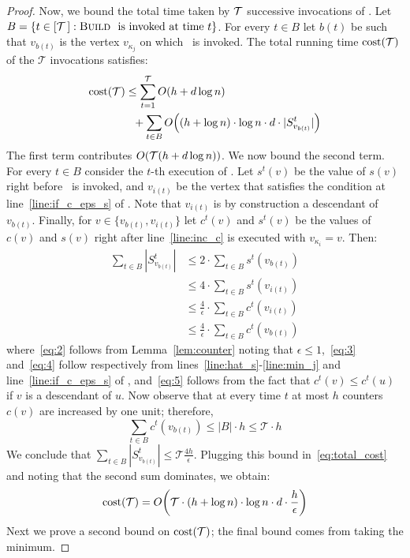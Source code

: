\begin{proof}
Now, we bound the total time taken by $\mathcal{T}$ successive invocations of \AlgoUpdate. Let $B = \{ t \in [\mathcal{T}\,]: \textsc{Build}\ \text{ is invoked at time } t\}$. For every $t \in B$ let $b(t)$ be such that $v_{b(t)}$ is the vertex $v_{\kappa_j}$ on which \AlgoBuild\ is invoked. The total running time $\operatorname*{\operatorname{cost}}(\mathcal T)$ of the $\mathcal T$ invocations satisfies:
\begin{align}
    \operatorname*{\operatorname{cost}}(\mathcal T) &\le \sum_{t=1}^{\mathcal T} O(h + d \log n)\nonumber \\&~~+ \sum_{t\in B} O\!\left((h+\log n) \cdot \log n \cdot d\cdot |S^t_{v_{b(t)}}|\right) \label{eq:total_cost} 
\end{align}
The first term contributes $O(\mathcal{T} (h+d \log n))$. We now bound the second term. For every $t \in B$ consider the $t$-th execution of \AlgoUpdate.
Let $s^t(v)$ be the value of $s(v)$ right before \AlgoBuild\ is invoked, and $v_{i(t)}$ be the vertex that satisfies the condition at line~\ref{line:if_c_eps_s} of \AlgoUpdate. Note that $v_{i(t)}$ is by construction a descendant of $v_{b(t)}$. Finally, for $v \in \{v_{b(t)},v_{i(t)}\}$ let $c^t({v})$ and $s^t(v)$ be the values of $c(v)$ and $s(v)$ right after line~\ref{line:inc_c} is executed with $v_{\kappa_i}=v$. Then:
\begin{align}
\sum_{t \in B}  |S^t_{v_{b(t)}}|
& \leq   2 \cdot \sum_ {t \in B}  s^t(v_{b(t)}) \label{eq:2} \\
& \leq  4 \cdot \sum_ {t \in B}  s^t(v_{i(t)}) \label{eq:3} \\
& \leq  \frac{4}{\epsilon} \cdot \sum_ {t \in B}  c^t(v_{i(t)}) \label{eq:4} \\
& \leq  \frac{4}{\epsilon} \cdot \sum_ {t \in B}  c^{t}(v_{b(t)}) \label{eq:5}
\end{align}
where~\eqref{eq:2} follows from Lemma~\ref{lem:counter} noting that $\epsilon \le 1$,~\eqref{eq:3} and~\eqref{eq:4} follow respectively from lines~\ref{line:hat_s}-\ref{line:min_j} and line~\ref{line:if_c_eps_s} of \AlgoUpdate, and~\eqref{eq:5} follows from the fact that $c^t(v) \leq c^t(u)$ if $v$ is a descendant of $u$. Now observe that at every time $t$ at most $h$ counters $c(v)$ are increased by one unit; therefore, 
\begin{equation}
\sum_{t\in B} c^t({v_{b(t)}}) \leq |B| \cdot h \leq \mathcal{T} \cdot h
\end{equation}
We conclude that $\sum_{t \in B}  |S^t_{v_{b(t)}}| \le \mathcal{T} \frac{4 h}{\epsilon} $. Plugging this bound in~\eqref{eq:total_cost} and noting that the second sum dominates, we obtain:
\begin{equation}\label{eq:cost_1}
    \operatorname*{\operatorname{cost}}(\mathcal T) = O\!\left(\mathcal{T} \cdot (h + \log n) \cdot \log n \cdot d \cdot  \frac{h}{\epsilon} \right) 
\end{equation}
Next we prove a second bound on $\operatorname*{\operatorname{cost}}(\mathcal T)$; the final bound comes from taking the minimum.


\end{proof}

